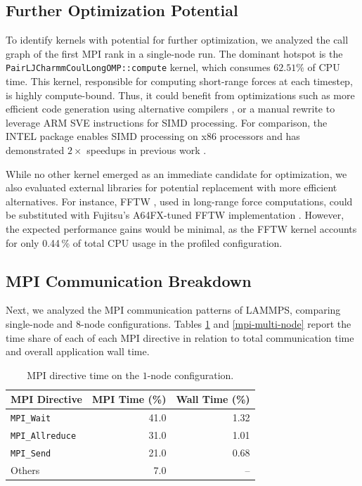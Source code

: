 \documentclass[sigplan, nonacm, screen]{acmart}
\begin{document}
\subsection{Further Optimization Potential} %
\label{profiling-further-optimization-potential}

To identify kernels with potential for further optimization, we analyzed the call graph of the first
MPI rank in a single-node run. The dominant hotspot is the \linebreak[4]
\texttt{PairLJCharmmCoulLongOMP::compute} kernel, which consumes $62.51\%$ of CPU time. This kernel,
responsible for computing short-range forces at each timestep, is highly compute-bound. Thus, it
could benefit from optimizations such as more efficient code generation using alternative compilers
\cite{optimizing-lammps}, or a manual rewrite to leverage ARM SVE instructions for SIMD processing.
For comparison, the INTEL package enables SIMD processing on x86 processors and has demonstrated
$2\times$ speedups in previous work \cite{lammps-slides}.

While no other kernel emerged as an immediate candidate for optimization, we also evaluated external
libraries for potential replacement with more efficient alternatives. For instance, FFTW
\cite{fftw}, used in long-range force computations, could be substituted with Fujitsu's A64FX-tuned
FFTW implementation \cite{fj-fftw}. However, the expected performance gains would be minimal, as the
FFTW kernel accounts for only 0.44\,\% of total CPU usage in the profiled configuration.

\subsection{MPI Communication Breakdown} %
\label{profiling-mpi}

Next, we analyzed the MPI communication patterns of LAMMPS, comparing single-node and 8-node
configurations. Tables \ref{mpi-single-node} and \ref{mpi-multi-node} report the time share of each
of each MPI directive in relation to total communication time and overall application wall time.

\begin{table}[h]
    \caption{MPI directive time on the $1$-node configuration.}
    \label{mpi-single-node}

    \begin{tabular}{lrr}
        \toprule
        MPI Directive           & MPI Time (\%) & Wall Time (\%) \\
        \midrule
        \texttt{MPI\_Wait}      &          41.0 &           1.32 \\
        \texttt{MPI\_Allreduce} &          31.0 &           1.01 \\
        \texttt{MPI\_Send}      &          21.0 &           0.68 \\
        Others                  &           7.0 &             -- \\
        \bottomrule
    \end{tabular}
\end{table}
\end{document}
